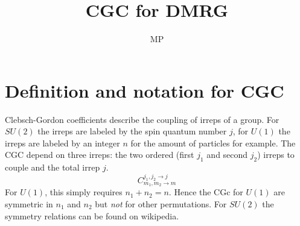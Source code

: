 \documentclass[a4paper,10pt,parskip=full]{scrartcl}
\title{CGC for DMRG}
\author{MP}
\begin{document}
\maketitle
\tableofcontents
\section{Definition and notation for CGC}
Clebsch-Gordon coefficients describe the coupling of irreps of a group.
For $SU(2)$ the irreps are labeled by the spin quantum number $j$, for $U(1)$
the irreps are labeled by an integer $n$ for the amount of particles for example.
The CGC depend on three irreps: the two ordered (first $j_1$ and second $j_2$) irreps to couple and the total irrep $j$.
\begin{equation}
  \label{eq:cgc-def}
  C^{j_1,j_2\rightarrow j}_{{m_1,m_2\rightarrow m}}
\end{equation}
For $U(1)$, this simply requires $n_1+n_2=n$. Hence the CGc for $U(1)$ are symmetric in $n_1$ and $n_2$
but \emph{not} for other permutations.
For $SU(2)$ the symmetry relations can be found on wikipedia.
\end{document}
